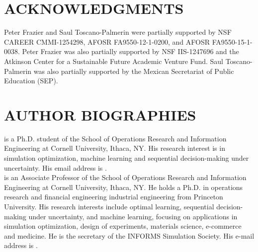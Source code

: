 \documentclass{wscpaperproc}
\theoremstyle{wsc}
\begin{document}
\section*{ACKNOWLEDGMENTS}
Peter Frazier and Saul Toscano-Palmerin were partially supported by NSF CAREER CMMI-1254298, AFOSR FA9550-12-1-0200, and AFOSR FA9550-15-1-0038.
Peter Frazier was also partially supported by NSF IIS-1247696 and the Atkinson Center for a Sustainable Future Academic Venture Fund.
Saul Toscano-Palmerin was also partially supported by the Mexican Secretariat of Public Education (SEP).








\section*{AUTHOR BIOGRAPHIES}

 is a Ph.D. student of the School of Operations Research and Information Engineering at Cornell University, Ithaca, NY. His research interest is in simulation optimization, machine learning and sequential decision-making under uncertainty. His email address is . \\

 is an Associate Professor of the School of Operations Research and Information Engineering at Cornell University, Ithaca, NY.  He holds a Ph.D. in operations research and financial engineering industrial engineering from Princeton University. His research interests include optimal learning, sequential decision-making under uncertainty, and machine learning, focusing on applications in simulation optimization, design of experiments, materials science, e-commerce and medicine. He is the secretary of the INFORMS Simulation Society.
His e-mail address is .\\
\end{document}

